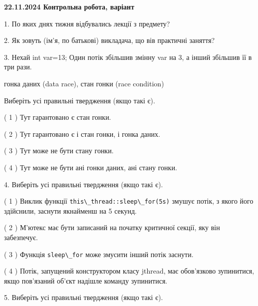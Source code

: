 \documentclass[12pt, ukrainian]{article}
\def\code#1{\Verb!#1!}
\begin{document}
\vspace{4mm}
\newpage
\begin {large}

\textbf{22.11.2024 Контрольна робота, варіант  }\par


{
1. По яких днях тижня відбувались лекції з предмету?



\vspace{5mm}
2. Як зовуть (ім'я, по батькові) викладача, що вів практичні заняття?



\vspace{5mm}
3. Нехай int var=13; Один потік збільшив змінну var на 3, а інший збільшив її в три рази.

гонка даних (data race), стан гонки (race condition)

Виберіть усі правильні твердження (якщо такі є).\par
\vspace{2mm}
( 1 ) Тут гарантовано є стан гонки.%

( 2 ) Тут гарантовано є і стан гонки, і гонка даних.%

( 3 ) Тут може не бути стану гонки.%

( 4 ) Тут може не бути ані гонки даних, ані стану гонки.%


\vspace{5mm}
4. Виберіть усі правильні твердження (якщо такі є).\par
\vspace{2mm}

( 1 ) Виклик функції \code{this\_thread::sleep\_for(5s)} змушує потік, з якого його здійснили, заснути якнайменш на 5 секунд.%

( 2 ) М’ютекс має бути записаний на початку критичної секції, яку він забезпечує.%

( 3 ) Функція \code{sleep\_for} може змусити інший потік заснути.%

( 4 ) Потік, запущений конструктором класу jthread, має обов’язково зупинитися, якщо пов’язаний об’єкт надішле команду зупинитися.%


\vspace{5mm}
5. Виберіть усі правильні твердження (якщо такі є).\par
\vspace{2mm}

}
\end{large}
\end{document}
